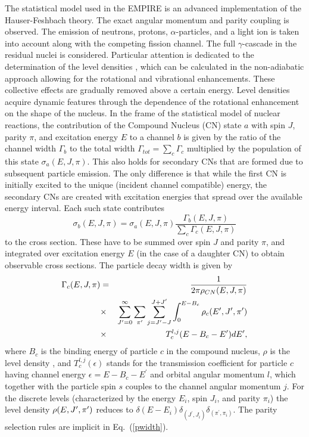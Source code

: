 The statistical model used in the EMPIRE is an advanced implementation of
the Hauser-Feshbach theory. The exact angular momentum and parity coupling
is observed. The emission of neutrons, protons, $\alpha$-particles, and a
light ion is taken into account along with the competing fission channel.
The full $\gamma$-cascade in the residual nuclei is considered. Particular
attention is dedicated to the determination of the level densities%
, which can be calculated in the non-adiabatic
approach allowing for the rotational and vibrational enhancements. These
collective effects are gradually removed above a certain energy. Level
densities acquire dynamic features through the dependence of the rotational
enhancement on the shape of the nucleus. In the frame of the statistical model
of nuclear reactions, the contribution of the Compound Nucleus (CN) state $a$
with spin $J$, parity $\pi$, and excitation energy $E$ to a channel $b$ is
given by the ratio of the channel width $\Gamma_{b}$ to the total width $%
\Gamma_{tot}=\sum_{c}\Gamma_{c}$ multiplied by the population of this state $%
\sigma_{a}(E,J,\pi)$. This also holds for secondary CNs that are formed due
to subsequent particle emission. The only difference is that while the
first CN is initially excited to the unique (incident channel compatible)
energy, the secondary CNs are created with excitation energies that spread
over the available energy interval. Each such state contributes \noindent
\begin{equation}
\sigma_{b}(E,J,\pi)=\sigma_{a}(E,J,\pi)%
\frac{\Gamma_{b}(E,J,\pi)}{\sum_{c}\Gamma_{c}(E,J,\pi)}  \label{Hauser}
\end{equation}
\noindent to the cross section. These have to be summed over spin $J$ and
parity $\pi$, and integrated over excitation energy $E$ (in the case
of a daughter
CN) to obtain observable cross sections. The particle decay width is given
by
\begin{eqnarray}
\Gamma_{c}(E,J,\pi)&=&\frac{1}{2\pi\rho_{CN}(E,J,\pi)}  \notag \\
&\times&\sum_{J^{\prime}=0}^{\infty}\sum_{\pi^{\prime}}\sum_{j=J^{%
\prime}-J}^{J+J^{\prime}}\int_{0}^{E-B_{c}}\rho_{c}(E^{\prime},J^{\prime},%
\pi^{\prime})  \notag \\
&\times&T_{c}^{l,j}(E-B_{c}-E^{\prime})dE^{\prime},  \label{pwidth}
\end{eqnarray}
\noindent where $B_{c}$ is the binding energy of particle $c$ in the
compound nucleus, $\rho$ is the level density%
, and $T_{c}^{l,j}(\epsilon)$ stands for the
transmission coefficient for particle $c$ having channel energy $%
\epsilon=E-B_{c}-E^{\prime}$ and orbital angular momentum $l$, which
together with the particle spin $s$ couples to the channel angular momentum $%
j$. For the discrete levels (characterized by the energy $E_{i}$, spin $%
J_{i} $, and parity $\pi_{i}$) the level density $\rho(E,J^{\prime},\pi^{%
\prime})$ reduces to $\delta(E-E_{i})\delta_{(J^{\prime},J_{i})}\delta_{(%
\pi^{\prime},\pi_{i})}$. The parity selection rules are implicit in
Eq.~(\ref{pwidth}).

